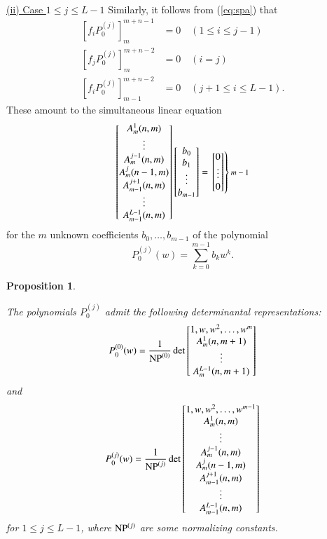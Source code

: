 \documentclass[12pt]{article}
\newtheorem{prop}[thm]{Proposition}
\numberwithin{equation}{section}
\begin{document}
\paragraph{}
\noindent
\underline{(ii) Case $1 \leq j \leq L-1$} \quad
Similarly, it follows from (\ref{eq:spa}) that
\begin{align*}
\left[
 f_i  P_0^{(j)}
\right]^{m+n-1}_{m}&=0 \quad (1 \leq i\leq j-1)
\\
\left[
 f_j  P_0^{(j)}
\right]^{m+n-2}_{m}&=0 \quad  (i=j)
\\
\left[
 f_i  P_0^{(j)}
\right]^{m+n-2}_{m-1}&=0 \quad  (j+1 \leq i \leq L-1).
\end{align*}
These amount to the simultaneous linear equation
\[
\begin{bmatrix}
A^1_{m}(n,m) 
\\
\vdots
\\
A^{j-1}_{m}(n,m) 
\\
A^{j}_{m}(n-1,m) 
\\
A^{j+1}_{m-1}(n,m)
\\
\vdots
\\
A^{L-1}_{m-1}(n,m) 
\end{bmatrix}
\begin{bmatrix} 
b_0 \\b_1 \\ \vdots \\b_{m-1}
\end{bmatrix}
=
\left.
\begin{bmatrix} 
0 \\ \vdots \\0
\end{bmatrix}
\right\} \text{\footnotesize $m-1$}
\]
for the $m$ unknown coefficients $b_0, \ldots, b_{m-1}$ of the polynomial
\[
P_0^{(j)}(w)=\sum_{k=0}^{ m-1  } b_{k}w^k.
\]



\begin{prop} 
\label{prop:detp}

The polynomials $P^{(j)}_0$ admit
the following 
determinantal representations{\rm:}
\[
P_0^{(0)}(w) 
=\frac{1}{{\rm NP}^{(0)}}
\det 
\begin{bmatrix}
1,w,w^2, \ldots, w^{m}
\\
A^1_{m}(n,m+1) 
\\
\vdots
\\
A^{L-1}_{m}(n,m+1) 
\end{bmatrix}
\]
and 
\[
P_0^{(j)}(w) 
=\frac{1}{{\rm NP}^{(j)}}
\det 
\begin{bmatrix}
1,w,w^2, \ldots, w^{m-1}
\\
A^1_{m}(n,m) 
\\
\vdots
\\
A^{j-1}_{m}(n,m)
\\ 
A^{j}_{m}(n-1,m)
\\ 
A^{j+1}_{m-1}(n,m)
\\
\vdots \\
A^{L-1}_{m-1}(n,m) 
\end{bmatrix}
\]
for $1 \leq j \leq L-1$,
where ${\rm NP}^{(j)}$ are some normalizing constants. 
\end{prop}
\end{document}
